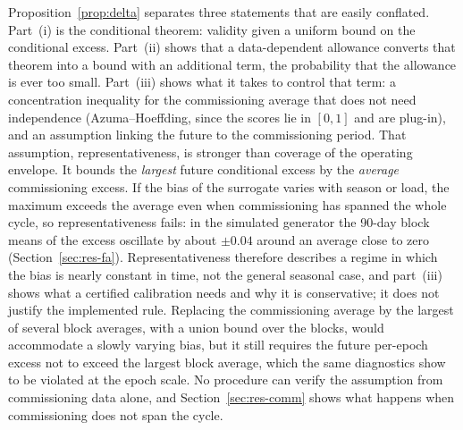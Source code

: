 \documentclass[12pt,a4paper]{article}
\newenvironment{revblock}{}{}
\newenvironment{revblock}{\begingroup\color{revcol}}{\endgroup}
\begin{document}
\begin{revblock}
Proposition~\ref{prop:delta} separates three statements that are easily conflated. Part~(i) is the conditional theorem: validity given a uniform bound on the conditional excess. Part~(ii) shows that a data-dependent allowance converts that theorem into a bound with an additional term, the probability that the allowance is ever too small. Part~(iii) shows what it takes to control that term: a concentration inequality for the commissioning average that does not need independence (Azuma--Hoeffding, since the scores lie in $[0,1]$ and are plug-in), and an assumption linking the future to the commissioning period. That assumption, representativeness, is stronger than coverage of the operating envelope. It bounds the \emph{largest} future conditional excess by the \emph{average} commissioning excess. If the bias of the surrogate varies with season or load, the maximum exceeds the average even when commissioning has spanned the whole cycle, so representativeness fails: in the simulated generator the 90-day block means of the excess oscillate by about $\pm0.04$ around an average close to zero (Section~\ref{sec:res-fa}). Representativeness therefore describes a regime in which the bias is nearly constant in time, not the general seasonal case, and part~(iii) shows what a certified calibration needs and why it is conservative; it does not justify the implemented rule. Replacing the commissioning average by the largest of several block averages, with a union bound over the blocks, would accommodate a slowly varying bias, but it still requires the future per-epoch excess not to exceed the largest block average, which the same diagnostics show to be violated at the epoch scale. No procedure can verify the assumption from commissioning data alone, and Section~\ref{sec:res-comm} shows what happens when commissioning does not span the cycle.


\end{revblock}
\end{document}

